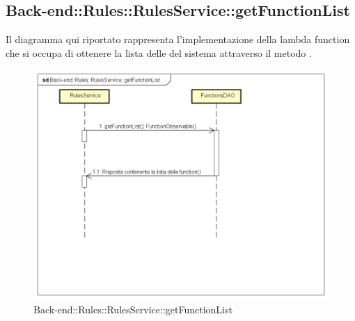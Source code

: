 \subsection{Back-end::Rules::RulesService::getFunctionList}
Il diagramma qui riportato rappresenta l'implementazione della lambda function che si occupa di ottenere la lista delle  del sistema attraverso il metodo .
 \begin{figure}[h] \centering \includegraphics[width=\textwidth,height=\textheight,keepaspectratio]{images/diagrams/back-end/Ufficial_Backend/Back-endRulesRulesServicegetFunctionList.png} 	\caption{Back-end::Rules::RulesService::getFunctionList}
\end{figure} 
\newpage

